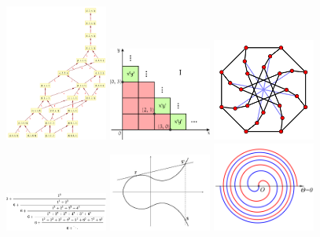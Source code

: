 \documentclass{deliverablereport}
\begin{document}
\begin{figure}
\begin{center}
    \includegraphics[width=0.3\textwidth]{images/359px-F4HassePoset}
    \hfil
    \includegraphics[width=0.3\textwidth]{images/Wikipic}
    \hfil
    \includegraphics[width=0.3\textwidth]{images/500px-McGee_graph}
    \includegraphics[width=0.3\textwidth]{images/fractioncont}
    \hfil
    \includegraphics[width=0.3\textwidth]{images/elliptic-curve}
    \hfil
    \includegraphics[width=0.3\textwidth]{images/548px-Fermat's_spiral_01}

\end{center}
\end{figure}
\end{document}
